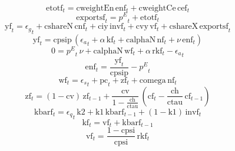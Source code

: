 \begin{dmath}
{{\mathrm{etotf}}}_{t}={{\mathrm{cweightEn}}}\, {{\mathrm{enf}}}_{t}+{{\mathrm{cweightCe}}}\, {{\mathrm{cef}}}_{t}
\end{dmath}
\begin{dmath}
{{\mathrm{exportsf}}}_{t}={{p^{E}}}_{t}+{{\mathrm{etotf}}}_{t}
\end{dmath}
\begin{dmath}
{{\mathrm{yf}}}_{t}={{\epsilon_{g}}}_{t}+{{\mathrm{cshareN}}}\, {{\mathrm{cnf}}}_{t}+{{\mathrm{ciy}}}\, {{\mathrm{invf}}}_{t}+{{\mathrm{cvy}}}\, {{\mathrm{vf}}}_{t}+{{\mathrm{cshareX}}}\, {{\mathrm{exportsf}}}_{t}
\end{dmath}
\begin{dmath}
{{\mathrm{yf}}}_{t}={{\mathrm{cpsip}}}\, \left({{\epsilon_{a}}}_{t}+{{\alpha}}\, {{\mathrm{kf}}}_{t}+{{\mathrm{calphaN}}}\, {{\mathrm{nf}}}_{t}+{{\nu}}\, {{\mathrm{enf}}}_{t}\right)
\end{dmath}
\begin{dmath}
0={{p^{E}}}_{t}\, {{\nu}}+{{\mathrm{calphaN}}}\, {{\mathrm{wf}}}_{t}+{{\alpha}}\, {{\mathrm{rkf}}}_{t}-{{\epsilon_{a}}}_{t}
\end{dmath}
\begin{dmath}
{{\mathrm{enf}}}_{t}=\frac{{{\mathrm{yf}}}_{t}}{{{\mathrm{cpsip}}}}-{{p^{E}}}_{t}
\end{dmath}
\begin{dmath}
{{\mathrm{wf}}}_{t}={{\epsilon_{s}}}_{t}+{{\mathrm{pc}}}_{t}+{{\mathrm{zf}}}_{t}+{{\mathrm{comega}}}\, {{\mathrm{nf}}}_{t}
\end{dmath}
\begin{dmath}
{{\mathrm{zf}}}_{t}=\left(1-{{\mathrm{cv}}}\right)\, {{\mathrm{zf}}}_{t-1}+\frac{{{\mathrm{cv}}}}{1-\frac{{{\mathrm{ch}}}}{{{\mathrm{ctau}}}}}\, \left({{\mathrm{cf}}}_{t}-\frac{{{\mathrm{ch}}}}{{{\mathrm{ctau}}}}\, {{\mathrm{cf}}}_{t-1}\right)
\end{dmath}
\begin{dmath}
{{\mathrm{kbarf}}}_{t}={{\epsilon_{q}}}_{t}\, {{\mathrm{k2}}}+{{\mathrm{k1}}}\, {{\mathrm{kbarf}}}_{t-1}+\left(1-{{\mathrm{k1}}}\right)\, {{\mathrm{invf}}}_{t}
\end{dmath}
\begin{dmath}
{{\mathrm{kf}}}_{t}={{\mathrm{vf}}}_{t}+{{\mathrm{kbarf}}}_{t-1}
\end{dmath}
\begin{dmath}
{{\mathrm{vf}}}_{t}=\frac{1-{{\mathrm{cpsi}}}}{{{\mathrm{cpsi}}}}\, {{\mathrm{rkf}}}_{t}
\end{dmath}
